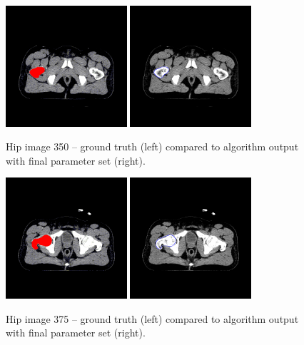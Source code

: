 \documentclass{article}
\begin{document}
		\begin{figure}[H]
			\centering
			\includegraphics[width=0.4\textwidth]{Hip4/groundTruth350col.png}
			\hspace{20pt}
			\includegraphics[width=0.4\textwidth]{Hip4/output350.png}
			\caption{Hip image 350 -- ground truth (left) compared to algorithm output with final parameter set (right).}
			\label{fig:hip4_350}
		\end{figure}
		\begin{figure}[H]
			\centering
			\includegraphics[width=0.4\textwidth]{Hip4/groundTruth375col.png}
			\hspace{20pt}
			\includegraphics[width=0.4\textwidth]{Hip4/output375.png}
			\caption{Hip image 375 -- ground truth (left) compared to algorithm output with final parameter set (right).}
			\label{fig:hip4_375}
		\end{figure}
\end{document}
